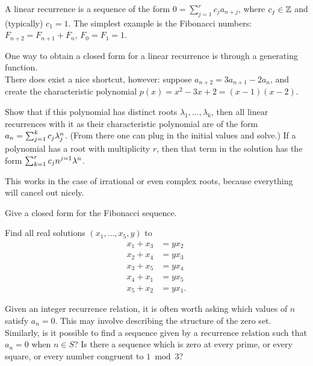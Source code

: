 %
\begin{defn}
A linear recurrence is a sequence of the form $0 = \sum_{j=1}^r c_ja_{n+j}$, where $c_j\in\mathbb{Z}$ and (typically) $c_1=1$. The simplest example is the Fibonacci numbers: $F_{n+2} = F_{n+1}+F_n$, $F_0=F_1=1$.\end{defn}
One way to obtain a closed form for a linear recurrence is through a generating function.\\
There does exist a nice shortcut, however: suppose $a_{n+2} = 3a_{n+1}-2a_n$, and create the characteristic polynomial $p(x) = x^2-3x+2 = (x-1)(x-2)$.
\begin{ex} Show that if this polynomial has distinct roots $\lambda_1,\dots,\lambda_k$, then all linear recurrences with it as their characteristic polynomial are of the form $a_n = \sum_{j=1}^k c_j\lambda_j^n$. (From there one can plug in the initial values and solve.) If a polynomial has a root with multiplicity $r$, then that term in the solution has the form $\sum_{k=1}^r c_jn^{j=1}\lambda^n$.\end{ex}
This works in the case of irrational or even complex roots, because everything will cancel out nicely.
\begin{ex} Give a closed form for the Fibonacci sequence.\end{ex}
\begin{ex} Find all real solutions $(x_1,\dots,x_5,y)$ to
\begin{align*}
x_1+x_3 &= yx_2\\
x_2+x_4 &= yx_3\\
x_3+x_5 &= yx_4\\
x_4+x_1 &= yx_5\\
x_5+x_2 &= yx_1.
\end{align*}
\end{ex}
Given an integer recurrence relation, it is often worth asking which values of $n$ satisfy $a_n = 0$. This may involve describing the structure of the zero set. Similarly, is it possible to find a sequence given by a recurrence relation such that $a_n = 0$ when $n\in S$? Is there a sequence which is zero at every prime, or every square, or every number congruent to $1\bmod 3$?\\
